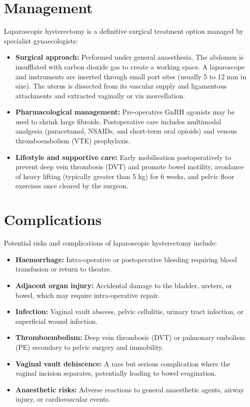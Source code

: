 \section*{Management}
Laparoscopic hysterectomy is a definitive surgical treatment option managed by specialist gynaecologists:
\begin{itemize}
    \item \textbf{Surgical approach:} Performed under general anaesthesia. The abdomen is insufflated with carbon dioxide gas to create a working space. A laparoscope and instruments are inserted through small port sites (usually 5 to 12 mm in size). The uterus is dissected from its vascular supply and ligamentous attachments and extracted vaginally or via morcellation.
    \item \textbf{Pharmacological management:} Pre-operative GnRH agonists may be used to shrink large fibroids. Postoperative care includes multimodal analgesia (paracetamol, NSAIDs, and short-term oral opioids) and venous thromboembolism (VTE) prophylaxis.
    \item \textbf{Lifestyle and supportive care:} Early mobilisation postoperatively to prevent deep vein thrombosis (DVT) and promote bowel motility, avoidance of heavy lifting (typically greater than 5 kg) for 6 weeks, and pelvic floor exercises once cleared by the surgeon.
\end{itemize}

\section*{Complications}
Potential risks and complications of laparoscopic hysterectomy include:
\begin{itemize}
    \item \textbf{Haemorrhage:} Intra-operative or postoperative bleeding requiring blood transfusion or return to theatre.
    \item \textbf{Adjacent organ injury:} Accidental damage to the bladder, ureters, or bowel, which may require intra-operative repair.
    \item \textbf{Infection:} Vaginal vault abscess, pelvic cellulitis, urinary tract infection, or superficial wound infection.
    \item \textbf{Thromboembolism:} Deep vein thrombosis (DVT) or pulmonary embolism (PE) secondary to pelvic surgery and immobility.
    \item \textbf{Vaginal vault dehiscence:} A rare but serious complication where the vaginal incision separates, potentially leading to bowel evagination.
    \item \textbf{Anaesthetic risks:} Adverse reactions to general anaesthetic agents, airway injury, or cardiovascular events.
\end{itemize}

